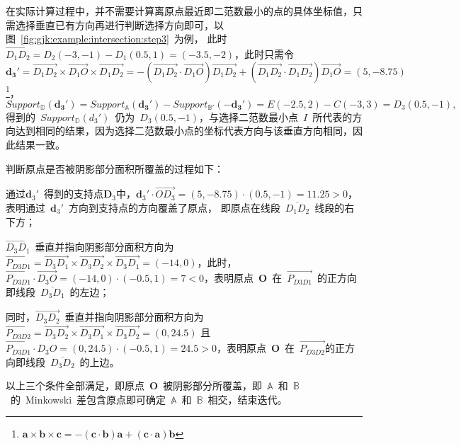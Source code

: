 在实际计算过程中，并不需要计算离原点最近即二范数最小的点的具体坐标值，只需选择垂直已有方向再进行判断选择方向即可，以图~\ref{fig:gjk:example:intersection:step3}~为例，
此时~$\overrightarrow{D_1D_2} = D_2(-3, -1) - D_1(0.5, 1) = (-3.5, -2)$，此时只需令~
$\bm{d_3'} = \overrightarrow{D_1D_2} \times \overrightarrow{D_1O} \times \overrightarrow{D_1D_2} = -(\overrightarrow{D_1D_2} \cdot \overrightarrow{D_1O})\overrightarrow{D_1D_2} +
(\overrightarrow{D_1D_2} \cdot \overrightarrow{D_1D_2})\overrightarrow{D_1O} = (5,-8.75)$
\footnote{$\bm{a} \times \bm{b} \times \bm{c} = -(\bm{c}\cdot\bm{b})\bm{a}+(\bm{c}\cdot\bm{a})\bm{b}$}，
$  Support_\mathbb{D}(\bm{d_3'})  = Support_\mathbb{A}(\bm{d_3'}) - Support_\mathbb{B'}(-\bm{d_3'})  = E(-2.5, 2) - C(-3, 3)  = D_3(0.5, -1),$
得到的~$Support_\mathbb{D}(d_3')$~仍为~$D_3(0.5,-1)$，与选择二范数最小点~$I$~所代表的方向达到相同的结果，因为选择二范数最小点的坐标代表方向与该垂直方向相同，因此结果一致。

判断原点是否被阴影部分面积所覆盖的过程如下：\\ \indent
\begin{inparaenum}[(1)]
  \item 通过$\bm{d}_3'$~得到的支持点$\bm{D}_3$中，$\bm{d}_3' \cdot \overrightarrow{OD_3} = (5, -8.75) \cdot (0.5, -1) = 11.25 > 0$，表明通过~$\bm{d}_3'$~方向到支持点的方向覆盖了原点，
    即原点在线段~$\overline{D_1D_2}$~线段的右下方；\\ \indent
  \item $\overrightarrow{D_3D_1}$~垂直并指向阴影部分面积方向为~$\overrightarrow{P_{D3D1}}=\overrightarrow{D_3D_1} \times \overrightarrow{D_3D_2} \times \overrightarrow{D_3D_1} = (-14, 0)$，此时，
    $\overrightarrow{P_{D3D1}} \cdot \overrightarrow{D_3O} = (-14, 0) \cdot (-0.5, 1) = 7 < 0$，表明原点~$\bm{O}$~在~$\overrightarrow{P_{D3D1}}$~的正方向即线段~$\overline{D_3D_1}$~的左边；\\ \indent
  \item 同时，$\overrightarrow{D_3D_2}$~垂直并指向阴影部分面积方向为~$\overrightarrow{P_{D3D2}}=\overrightarrow{D_3D_2}
\times \overrightarrow{D_3D_1} \times \overrightarrow{D_3D_2} = (0, 24.5)$
且~$\overrightarrow{P_{D3D1}} \cdot D_3O = (0, 24.5) \cdot (-0.5, 1) = 24.5 > 0$，表明原点~$\bm{O}$~在~$\overrightarrow{P_{D3D2}}$的正方向即线段~$\overline{D_3D_2}$~的上边。\\ \indent
\end{inparaenum}
以上三个条件全部满足，即原点~$\bm{O}$~被阴影部分所覆盖，即~$\mathbb{A}$~和~$\mathbb{B}$~的~Minkowski~差包含原点即可确定~$\mathbb{A}$~和~$\mathbb{B}$~相交，结束迭代。

